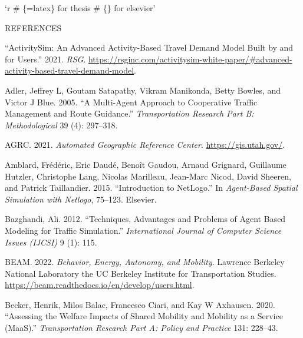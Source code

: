 \documentclass[12pt, oneside, openright]{byuthesis}
\newlength{\cslhangindent}
\newlength{\cslentryspacingunit} %
\newenvironment{CSLReferences}[2] %
 {%
  \setlength{\parindent}{0pt}
  \ifodd #1
  \let\oldpar\par
  \def\par{\hangindent=\cslhangindent\oldpar}
  \fi
  \setlength{\parskip}{#2\cslentryspacingunit}
 }%
 {}
\begin{document}
`r
\# \{=latex\} for thesis
\# \{\} for elsevier'

\cleardoublepage
    \begin{centering}
    REFERENCES\\
     \baselineskip
    \end{centering}
    

\hypertarget{refs}{}
\begin{CSLReferences}{1}{0}
\leavevmode{}%
{``ActivitySim: An Advanced Activity-Based Travel Demand Model Built by and for Users.''} 2021. \emph{RSG}. \url{https://rsginc.com/activitysim-white-paper/\#advanced-activity-based-travel-demand-model}.

\leavevmode{}%
Adler, Jeffrey L, Goutam Satapathy, Vikram Manikonda, Betty Bowles, and Victor J Blue. 2005. {``A Multi-Agent Approach to Cooperative Traffic Management and Route Guidance.''} \emph{Transportation Research Part B: Methodological} 39 (4): 297--318.

\leavevmode{}%
AGRC. 2021. \emph{Automated Geographic Reference Center}. \url{https://gis.utah.gov/}.

\leavevmode{}%
Amblard, Frédéric, Eric Daudé, Benoît Gaudou, Arnaud Grignard, Guillaume Hutzler, Christophe Lang, Nicolas Marilleau, Jean-Marc Nicod, David Sheeren, and Patrick Taillandier. 2015. {``Introduction to NetLogo.''} In \emph{Agent-Based Spatial Simulation with Netlogo}, 75--123. Elsevier.

\leavevmode{}%
Bazghandi, Ali. 2012. {``Techniques, Advantages and Problems of Agent Based Modeling for Traffic Simulation.''} \emph{International Journal of Computer Science Issues (IJCSI)} 9 (1): 115.

\leavevmode{}%
BEAM. 2022. \emph{Behavior, Energy, Autonomy, and Mobility}. Lawrence Berkeley National Laboratory the UC Berkeley Institute for Transportation Studies. \url{https://beam.readthedocs.io/en/develop/users.html}.

\leavevmode{}%
Becker, Henrik, Milos Balac, Francesco Ciari, and Kay W Axhausen. 2020. {``Assessing the Welfare Impacts of Shared Mobility and Mobility as a Service (MaaS).''} \emph{Transportation Research Part A: Policy and Practice} 131: 228--43.


\end{CSLReferences}
\end{document}
